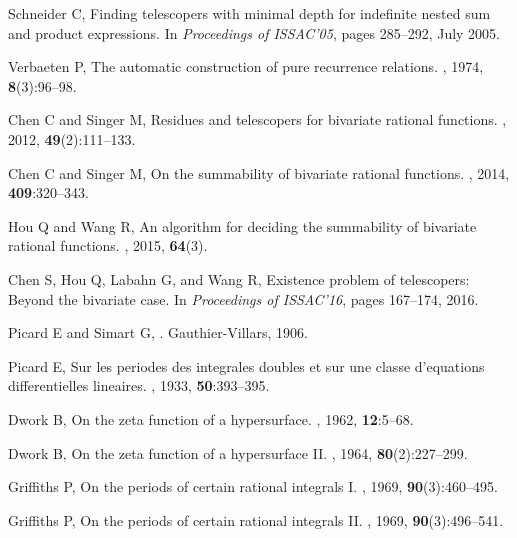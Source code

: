 \documentclass{jssc}
\begin{document}
\begin{thebibliography}{100}
Schneider C,
\newblock Finding telescopers with minimal depth for indefinite nested sum and
  product expressions.
\newblock In {\it Proceedings of ISSAC'05}, pages 285--292, July 2005.

Verbaeten P,
\newblock The automatic construction of pure recurrence relations.
, 1974, {\bf 8}(3):96--98.

 Chen C and  Singer M,
\newblock Residues and telescopers for bivariate rational functions.
, 2012, {\bf 49}(2):111--133.

 Chen C and  Singer M,
\newblock On the summability of bivariate rational functions.
, 2014, {\bf 409}:320--343.

Hou Q and Wang R,
\newblock An algorithm for deciding the summability of bivariate rational
  functions.
, 2015, {\bf 64}(3).

Chen S, Hou Q, Labahn G, and Wang R,
\newblock Existence problem of telescopers: Beyond the bivariate case.
\newblock In {\it Proceedings of ISSAC'16}, pages 167--174, 2016.

Picard E and Simart G,
.
\newblock Gauthier-Villars, 1906.

Picard E,
\newblock Sur les periodes des integrales doubles et sur une classe d'equations
  differentielles lineaires.
, 1933, {\bf 50}:393--395.

Dwork B,
\newblock On the zeta function of a hypersurface.
, 1962, {\bf 12}:5--68.

Dwork B,
\newblock On the zeta function of a hypersurface {II}.
, 1964, {\bf 80}(2):227--299.

Griffiths P,
\newblock On the periods of certain rational integrals {I}.
, 1969, {\bf 90}(3):460--495.

Griffiths P,
\newblock On the periods of certain rational integrals {II}.
, 1969, {\bf 90}(3):496--541.


\end{thebibliography}
\end{document}
